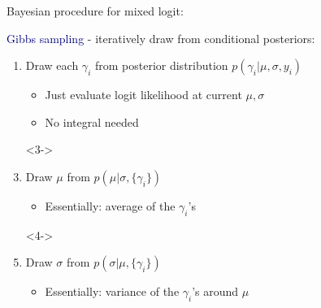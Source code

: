 \documentclass[aspectratio=169]{beamer}
\begin{document}
\begin{frame}

Bayesian procedure for mixed logit:

\bigskip

\textcolor{navy}{Gibbs sampling} - iteratively draw from conditional posteriors:
\bigskip\par

\begin{enumerate}
\item<2-> Draw each $\gamma_i$ from posterior distribution $p(\gamma_i | \mu, \sigma, y_i)$ 
\begin{itemize}
\item Just evaluate logit likelihood at current $\mu, \sigma$
\item No integral needed
\end{itemize}
\item[]<3->
\item<3-> Draw $\mu$ from $p(\mu | \sigma, \{\gamma_i\})$ 
\begin{itemize}
\item Essentially: average of the $\gamma_i$'s
\end{itemize}
\item[]<4->
\item<4-> Draw $\sigma$ from $p(\sigma | \mu, \{\gamma_i\})$
\begin{itemize}
\item Essentially: variance of the $\gamma_i$'s around $\mu$
\end{itemize}
\end{enumerate}


\end{frame}
\end{document}
